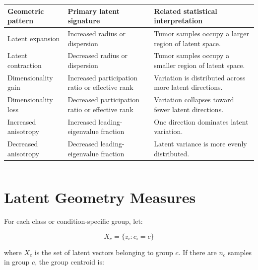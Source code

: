 \documentclass[
  letterpaper,
  DIV=11,
  numbers=noendperiod,
  openany,
  oneside]{scrreprt}
\begin{document}
\begin{longtable}[]{@{}
  >{\raggedright\arraybackslash}p{}
  >{\raggedright\arraybackslash}p{}
  >{\raggedright\arraybackslash}p{}@{}}
\toprule\noalign{}
\begin{minipage}[b]{\linewidth}\raggedright
Geometric pattern
\end{minipage} & \begin{minipage}[b]{\linewidth}\raggedright
Primary latent signature
\end{minipage} & \begin{minipage}[b]{\linewidth}\raggedright
Related statistical interpretation
\end{minipage} \\
\midrule\noalign{}
\endhead
\bottomrule\noalign{}
\endlastfoot
Latent expansion & Increased radius or dispersion & Tumor samples occupy
a larger region of latent space. \\
Latent contraction & Decreased radius or dispersion & Tumor samples
occupy a smaller region of latent space. \\
Dimensionality gain & Increased participation ratio or effective rank &
Variation is distributed across more latent directions. \\
Dimensionality loss & Decreased participation ratio or effective rank &
Variation collapses toward fewer latent directions. \\
Increased anisotropy & Increased leading-eigenvalue fraction & One
direction dominates latent variation. \\
Decreased anisotropy & Decreased leading-eigenvalue fraction & Latent
variance is more evenly distributed. \\
\end{longtable}

\begin{center}\rule{0.5\linewidth}{0.5pt}\end{center}

\section{Latent Geometry Measures}\label{latent-geometry-measures}

For each class or condition-specific group, let:

\[
X_c = \{z_i : c_i = c\}
\]

where \(X_c\) is the set of latent vectors belonging to group \(c\). If
there are \(n_c\) samples in group \(c\), the group centroid is:
\end{document}
